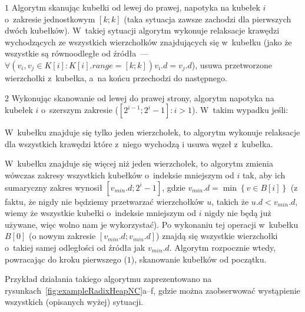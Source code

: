 \begin{myitemize}
	\item[$1$] Algorytm skanując kubełki od lewej do prawej, napotyka na kubełek $i$ o~zakresie jednostkowym $\left[ k ; k \right]$ (taka sytuacja zawsze zachodzi dla pierwszych dwóch kubełków).
	W~takiej sytuacji algorytm wykonuje relaksacje krawędzi wychodzących ze wszystkich wierzchołków znajdujących się w~kubełku (jako że wszystkie są równoodległe od źródła~--- $\forall \left( v_{i}, v_{j} \in K \left[ i \right] : K \left[ i \right].range = \left[ k ; k \right] \right) v_{i}.d = v_{j}.d$), usuwa przetworzone wierzchołki z~kubełka, a~na końcu przechodzi do następnego.
	\item[$2$] Wykonując skanowanie od lewej do prawej strony, algorytm napotyka na kubełek $i$ o~szerszym zakresie ($\left[ 2^{i-1} ; 2^{i} - 1 \right] : i > 1$).
	W~takim wypadku jeśli:
	\begin{myitemize}
		\item W~kubełku znajduje się tylko jeden wierzchołek, to algorytm wykonuje relaksacje dla wszystkich krawędzi które z~niego wychodzą i usuwa węzeł z~kubełka.
		\item W~kubełku znajduje się więcej niż jeden wierzchołek, to algorytm zmienia wówczas zakresy wszystkich kubełków o~indeksie mniejszym od $i$ tak, aby ich sumaryczny zakres wynosił $\left[ v_{min}.d ; 2^{i} - 1 \right]$, gdzie $v_{min}.d = \min \left\{ v \in B \left[ i \right] \right\}$ (z faktu, że nigdy nie będziemy przetwarzać wierzchołków $u$, takich że $u.d < v_{min}.d$, wiemy że wszystkie kubełki o~indeksie mniejszym od $i$ nigdy nie będą już używane, więc wolno nam je wykorzystać).
		Po wykonaniu tej operacji w~kubełku $B \left[ 0 \right]$ (o nowym zakresie $\left[ v_{min}.d ; v_{min}.d \right]$) znajdą się wszystkie wierzchołki o~takiej samej odległości od źródła jak $v_{min}.d$.
		Algorytm rozpocznie wtedy, powracając do kroku pierwszego ($1$), skanowanie kubełków od początku.
	\end{myitemize}
\end{myitemize}

Przykład działania takiego algorytmu zaprezentowano na rysunkach~\ref{fig:exampleRadixHeapNC}a--f, gdzie można zaobserwować wystąpienie wszystkich (opisanych wyżej) sytuacji.

